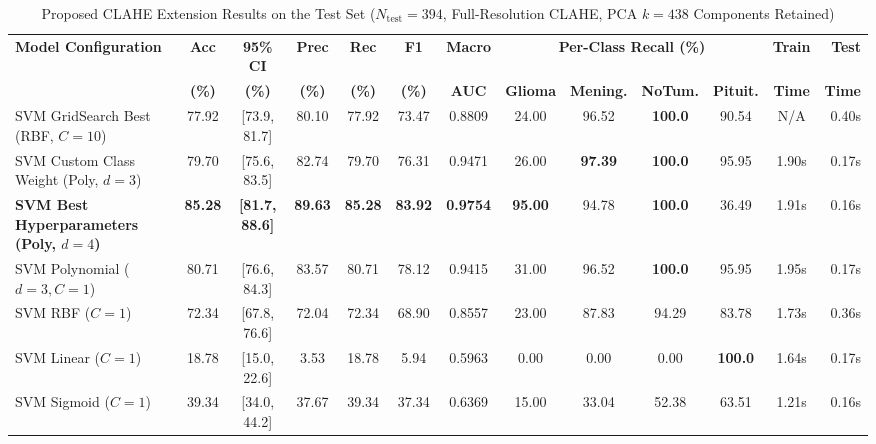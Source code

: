 \documentclass[conference]{IEEEtran}
\begin{document}
\begin{table}[t]
\centering
\caption{Proposed CLAHE Extension Results on the Test Set ($N_{\text{test}} = 394$, Full-Resolution CLAHE, PCA $k = 438$ Components Retained)}
\label{tab:clahe_results}
\setlength{\tabcolsep}{4.8pt}
\begin{tabular}{lcccccccccccr}
\toprule
\multirow{2}{*}{\textbf{Model Configuration}} & \textbf{Acc} & \textbf{95\% CI} & \textbf{Prec} & \textbf{Rec} & \textbf{F1} & \textbf{Macro} & \multicolumn{4}{c}{\textbf{Per-Class Recall (\%)}} & \textbf{Train} & \textbf{Test} \\
\cmidrule(lr){8-11}
 & \textbf{(\%)} & \textbf{(\%)} & \textbf{(\%)} & \textbf{(\%)} & \textbf{(\%)} & \textbf{AUC} & \textbf{Glioma} & \textbf{Mening.} & \textbf{NoTum.} & \textbf{Pituit.} & \textbf{Time} & \textbf{Time} \\
\midrule
SVM GridSearch Best (RBF, $C=10$)      & 77.92 & [73.9, 81.7] & 80.10 & 77.92 & 73.47 & 0.8809 & 24.00 & 96.52 & \textbf{100.0} & 90.54 & N/A   & 0.40s \\
SVM Custom Class Weight (Poly, $d=3$)  & 79.70 & [75.6, 83.5] & 82.74 & 79.70 & 76.31 & 0.9471 & 26.00 & \textbf{97.39} & \textbf{100.0} & 95.95 & 1.90s & 0.17s \\
\textbf{SVM Best Hyperparameters (Poly, $d=4$)} & \textbf{85.28} & \textbf{[81.7, 88.6]} & \textbf{89.63} & \textbf{85.28} & \textbf{83.92} & \textbf{0.9754} & \textbf{95.00} & 94.78 & \textbf{100.0} & 36.49 & 1.91s & 0.16s \\
SVM Polynomial ($d=3, C=1$)            & 80.71 & [76.6, 84.3] & 83.57 & 80.71 & 78.12 & 0.9415 & 31.00 & 96.52 & \textbf{100.0} & 95.95 & 1.95s & 0.17s \\
SVM RBF ($C=1$)                        & 72.34 & [67.8, 76.6] & 72.04 & 72.34 & 68.90 & 0.8557 & 23.00 & 87.83 & 94.29 & 83.78 & 1.73s & 0.36s \\
SVM Linear ($C=1$)                     & 18.78 & [15.0, 22.6] &  3.53 & 18.78 &  5.94 & 0.5963 &  0.00 &  0.00 &  0.00 & \textbf{100.0} & 1.64s & 0.17s \\
SVM Sigmoid ($C=1$)                    & 39.34 & [34.0, 44.2] & 37.67 & 39.34 & 37.34 & 0.6369 & 15.00 & 33.04 & 52.38 & 63.51 & 1.21s & 0.16s \\
\bottomrule
\end{tabular}
\end{table}
\end{document}
